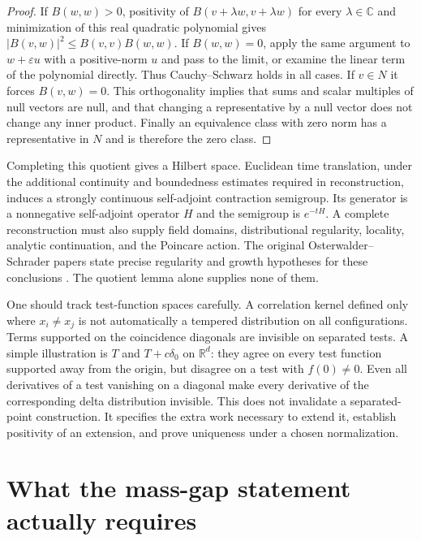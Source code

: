 \begin{proof}
If $B(w,w)>0$, positivity of
$B(v+\lambda w,v+\lambda w)$ for every $\lambda\in\mathbb C$
and minimization of this real quadratic polynomial gives
$|B(v,w)|^2\leq B(v,v)B(w,w)$.  If $B(w,w)=0$, apply the same
argument to $w+\varepsilon u$ with a positive-norm $u$ and pass to the
limit, or examine the linear term of the polynomial directly.  Thus
Cauchy--Schwarz holds in all cases.  If $v\in N$ it forces
$B(v,w)=0$.  This orthogonality implies that sums and scalar multiples of
null vectors are null, and that changing a representative by a null vector
does not change any inner product.  Finally an equivalence class with zero
norm has a representative in $N$ and is therefore the zero class.
\end{proof}

Completing this quotient gives a Hilbert space.  Euclidean time translation,
under the additional continuity and boundedness estimates required in
reconstruction, induces a strongly continuous self-adjoint contraction
semigroup.  Its generator is a nonnegative self-adjoint operator $H$ and
the semigroup is $e^{-tH}$.  A complete reconstruction must also supply
field domains, distributional regularity, locality, analytic continuation, and the Poincare action.  The original Osterwalder--Schrader papers state
precise regularity and growth hypotheses for these conclusions
\cite{OS1973,OS1975}.  The quotient lemma alone supplies none of them.

One should track test-function spaces carefully.  A correlation kernel
defined only where $x_i\ne x_j$ is not automatically a tempered
distribution on all configurations.  Terms supported on the coincidence
diagonals are invisible on separated tests.  A simple illustration is
$T$ and $T+c\delta_0$ on $\mathbb R^d$: they agree on every test
function supported away from the origin, but disagree on a test with
$f(0)\ne0$.  Even all derivatives of a test vanishing on a diagonal
make every derivative of the corresponding delta distribution invisible.
This does not invalidate a separated-point construction.  It specifies the
extra work necessary to extend it, establish positivity of an extension,
and prove uniqueness under a chosen normalization.

\section{What the mass-gap statement actually requires}


